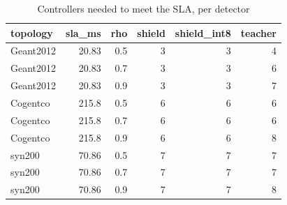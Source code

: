 \begin{table}
\caption{Controllers needed to meet the SLA, per detector}
\begin{tabular}{lrrrrr}
\toprule
topology & sla_ms & rho & shield & shield_int8 & teacher \\
\midrule
Geant2012 & 20.83 & 0.5 & 3 & 3 & 4 \\
Geant2012 & 20.83 & 0.7 & 3 & 3 & 6 \\
Geant2012 & 20.83 & 0.9 & 3 & 3 & 7 \\
Cogentco & 215.8 & 0.5 & 6 & 6 & 6 \\
Cogentco & 215.8 & 0.7 & 6 & 6 & 6 \\
Cogentco & 215.8 & 0.9 & 6 & 6 & 8 \\
syn200 & 70.86 & 0.5 & 7 & 7 & 7 \\
syn200 & 70.86 & 0.7 & 7 & 7 & 7 \\
syn200 & 70.86 & 0.9 & 7 & 7 & 8 \\
\bottomrule
\end{tabular}
\end{table}
